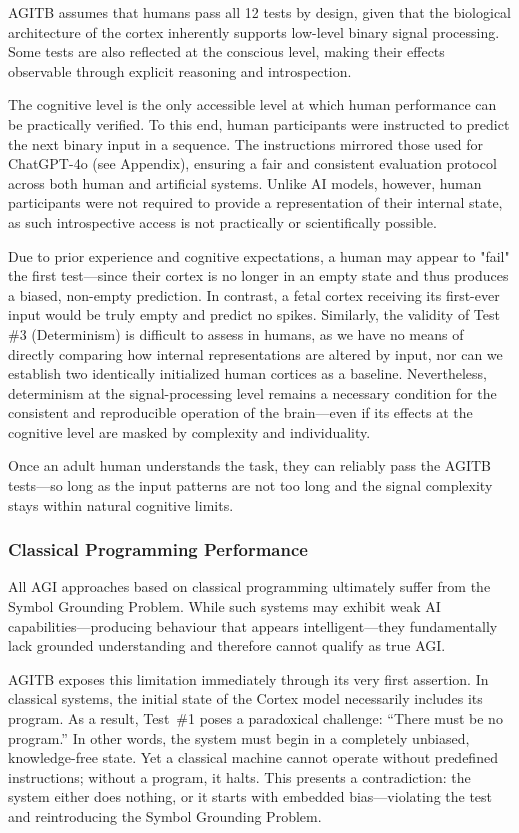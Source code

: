 \documentclass{article}
\begin{document}
	AGITB assumes that humans pass all 12 tests by design, given that the biological architecture of the cortex inherently supports low-level binary signal processing. Some tests are also reflected at the conscious level, making their effects observable through explicit reasoning and introspection.
	
	The cognitive level is the only accessible level at which human performance can be practically verified. To this end, human participants were instructed to predict the next binary input in a sequence. The instructions mirrored those used for ChatGPT-4o (see Appendix), ensuring a fair and consistent evaluation protocol across both human and artificial systems. Unlike AI models, however, human participants were not required to provide a representation of their internal state, as such introspective access is not practically or scientifically possible.
	
	Due to prior experience and cognitive expectations, a human may appear to "fail" the first test—since their cortex is no longer in an empty state and thus produces a biased, non-empty prediction. In contrast, a fetal cortex receiving its first-ever input would be truly empty and predict no spikes. Similarly, the validity of Test \#3 (Determinism) is difficult to assess in humans, as we have no means of directly comparing how internal representations are altered by input, nor can we establish two identically initialized human cortices as a baseline. Nevertheless, determinism at the signal-processing level remains a necessary condition for the consistent and reproducible operation of the brain—even if its effects at the cognitive level are masked by complexity and individuality.
	
	Once an adult human understands the task, they can reliably pass the AGITB tests—so long as the input patterns are not too long and the signal complexity stays within natural cognitive limits.
	
	
	\subsubsection{Classical Programming Performance}
	
	All AGI approaches based on classical programming ultimately suffer from the Symbol Grounding Problem. While such systems may exhibit weak AI capabilities—producing behaviour that appears intelligent—they fundamentally lack grounded understanding and therefore cannot qualify as true AGI.
	
	AGITB exposes this limitation immediately through its very first assertion. In classical systems, the initial state of the Cortex model necessarily includes its program. As a result, Test~\#1 poses a paradoxical challenge: “There must be no program.” In other words, the system must begin in a completely unbiased, knowledge-free state. Yet a classical machine cannot operate without predefined instructions; without a program, it halts. This presents a contradiction: the system either does nothing, or it starts with embedded bias—violating the test and reintroducing the Symbol Grounding Problem.
	
\end{document}
